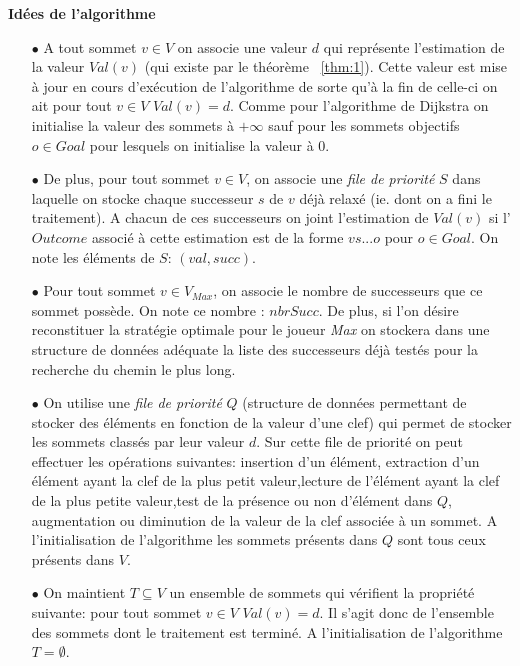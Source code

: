 \noindent \textbf{Idées de l'algorithme}\\

\begin{enumerate}
	
	\item[$\bullet$] A tout sommet $v \in V$ on associe une valeur $d$ qui représente l'estimation de la valeur $Val(v)$ (qui existe par le théorème ~\ref{thm:1}). Cette valeur est mise à jour en cours d'exécution de l'algorithme de sorte qu'à la fin de celle-ci on ait pour tout $v \in V$ $Val(v) = d$. Comme pour l'algorithme de Dijkstra on initialise la valeur des sommets à $+\infty$ sauf pour les sommets objectifs $o \in Goal$ pour lesquels on initialise la valeur à 0.
	
	\item[$\bullet$] De plus, pour tout sommet $v \in V$, on associe une \textit{file de priorité} $S$ dans laquelle on stocke chaque successeur $s$ de $v$ déjà relaxé (ie. dont on a fini le traitement). A chacun de ces successeurs on joint l'estimation de  $Val(v)$ si l'$Outcome$ associé à cette estimation est de la forme $v s ... o$ pour $o \in Goal$. On note les éléments de $S$: $(val,succ)$.
	
	\item[$\bullet$] Pour tout sommet $v \in V_{Max}$, on associe le nombre de successeurs que ce sommet possède. On note ce nombre : $nbrSucc$. De plus, si l'on désire reconstituer la stratégie optimale pour le joueur \textit{Max} on stockera dans une structure de données adéquate la liste des successeurs déjà testés pour la recherche du chemin le plus long.
	
		\item[$\bullet$] On utilise une \textit{file de priorité} $Q$ (structure de données permettant de stocker des éléments en fonction de la valeur d'une clef) qui permet de stocker les sommets classés par leur valeur $d$. Sur cette file de priorité on peut effectuer les opérations suivantes: insertion d'un élément, extraction d'un élément ayant la clef de la plus petit valeur,lecture de l'élément ayant la clef de la plus petite valeur,test de la présence ou non d'élément dans $Q$, augmentation ou diminution de la valeur de la clef associée à un sommet. A l'initialisation de l'algorithme les sommets présents dans $Q$ sont tous ceux présents dans $V$.
	
	\item[$\bullet$] On maintient $T \subseteq V$ un ensemble de sommets qui vérifient la propriété suivante: pour tout sommet $v \in V$ $Val(v) = d$. Il s'agit donc de l'ensemble des sommets dont le traitement est terminé. A l'initialisation de l'algorithme $T = \emptyset$.
	

\end{enumerate}
